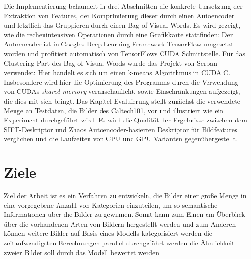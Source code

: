 Die Implementierung behandelt in drei Abschnitten die konkrete Umsetzung der Extraktion von Features, der Komprimierung dieser durch einen Autoencoder und letztlich das Gruppieren durch einen Bag of Visual Words. Es wird gezeigt, wie die  rechenintensiven Operationen durch eine Grafikkarte stattfinden: Der Autoencoder ist in Googles Deep Learning Framework TensorFlow umgesetzt worden und profitiert automatisch von TensorFlows CUDA Schnittstelle. Für das Clustering Part des Bag of Visual Words wurde das Projekt von Serban verwendet: Hier handelt es sich um einen k-means Algorithmus in CUDA C. Insbesondere wird hier die Optimierung des Programms durch die Verwendung von CUDAs \textit{shared memory} veranschaulicht, sowie Einschränkungen aufgezeigt, die dies mit sich bringt.\newline
Das Kapitel Evaluierung stellt zunächst die verwendete Menge an Testdaten, die Bilder des \glqq Caltech101\grqq, vor und illustriert wie ein Experiment durchgeführt wird. Es wird die Qualität der Ergebnisse zwischen dem SIFT-Deskriptor und Zhaos Autoencoder-basierten Deskriptor für Bildfeatures verglichen und die Laufzeiten von CPU und GPU Varianten gegenübergestellt.


\section{Ziele}

 Ziel der Arbeit ist es ein Verfahren zu entwickeln, die Bilder einer große Menge in eine vorgegebene Anzahl von Kategorien einzuteilen, um so semantische Informationen über die Bilder zu gewinnen. Somit kann zum Einen ein Überblick über die vorhandenen Arten von Bildern hergestellt werden und zum Anderen können weitere Bilder auf Basis eines Modells kategorisiert werden
die zeitaufwendigsten Berechnungen parallel durchgeführt werden
die Ähnlichkeit zweier Bilder soll durch das Modell bewertet werden 